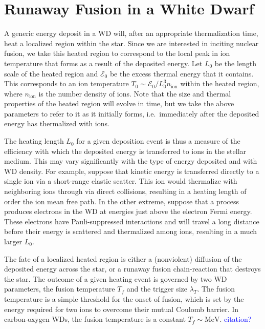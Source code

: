 \documentclass[twocolumn,showpacs,preprintnumbers,amsmath,amssymb,prd]{revtex4}
\newcommand{\Ez}{\mathcal{E}_0}
\newcommand{\MeV}{\text{MeV}}
\begin{document}
\section{Runaway Fusion in a White Dwarf}
\label{sec:Review}

A generic energy deposit in a WD will, after an appropriate thermalization time, heat a localized region within the star. 
Since we are interested in inciting nuclear fusion, we take this heated region to correspond to the local peak in ion temperature that forms as a result of the deposited energy. 
Let $L_0$ be the length scale of the heated region and $\Ez$ be the excess thermal energy that it contains.
This corresponds to an ion temperature $T_0 \sim \Ez / L_0^3 n_\text{ion}$ within the heated region, where $n_\text{ion}$ is the number density of ions.
Note that the size and thermal properties of the heated region will evolve in time, but we take the above parameters to refer to it as it initially forms, i.e.\ immediately after the deposited energy has thermalized with ions.  

The heating length $L_0$ for a given deposition event is thus a measure of the efficiency with which the deposited energy is transferred to ions in the stellar medium.
This may vary significantly with the type of energy deposited and with WD density.
For example, suppose that kinetic energy is transferred directly to a single ion via a short-range elastic scatter.
This ion would thermalize with neighboring ions through via direct collisions, resulting in a heating length of order the ion mean free path.
In the other extreme, suppose that a process produces electrons in the WD at energies just above the electron Fermi energy.
These electrons have Pauli-suppressed interactions and will travel a long distance before their energy is scattered and thermalized among ions, resulting in a much larger $L_0$.

The fate of a localized heated region is either a (nonviolent) diffusion of the deposited energy across the star, or a runaway fusion chain-reaction that destroys the star.
The outcome of a given heating event is governed by two WD parameters, the fusion temperature $T_f$ and the trigger size $\lambda_T$.
The fusion temperature is a simple threshold for the onset of fusion, which is set by the energy required for two ions to overcome their mutual Coulomb barrier.
In carbon-oxygen WDs, the fusion temperature is a constant $T_f \sim \MeV$. \textcolor{blue}{citation?}
\end{document}
